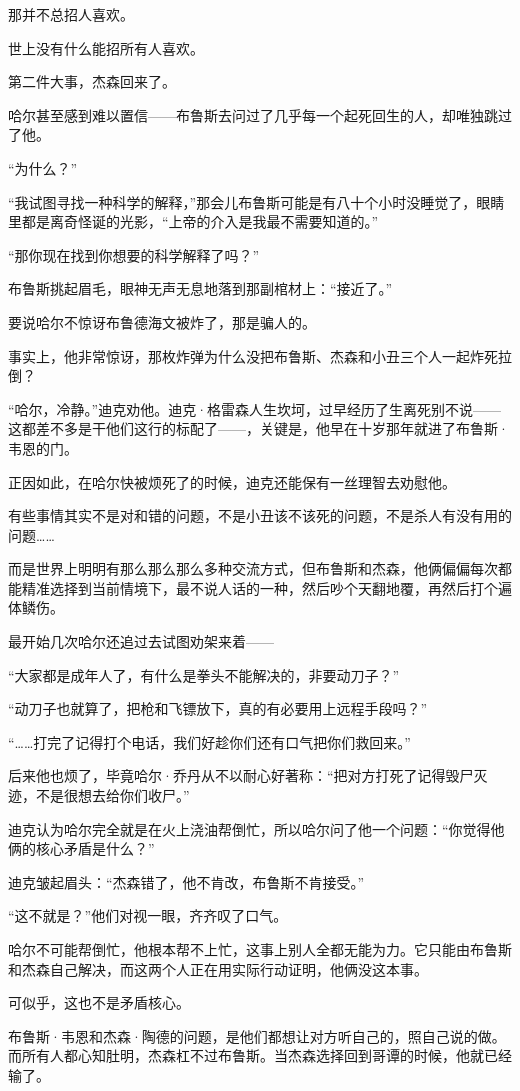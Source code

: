 \documentclass[../main]{subfiles}
\begin{document}
那并不总招人喜欢。

世上没有什么能招所有人喜欢。

第二件大事，杰森回来了。

哈尔甚至感到难以置信——布鲁斯去问过了几乎每一个起死回生的人，却唯独跳过了他。

“为什么？”

“我试图寻找一种科学的解释，”那会儿布鲁斯可能是有八十个小时没睡觉了，眼睛里都是离奇怪诞的光影，“上帝的介入是我最不需要知道的。”

“那你现在找到你想要的科学解释了吗？”

布鲁斯挑起眉毛，眼神无声无息地落到那副棺材上：“接近了。”

要说哈尔不惊讶布鲁德海文被炸了，那是骗人的。

事实上，他非常惊讶，那枚炸弹为什么没把布鲁斯、杰森和小丑三个人一起炸死拉倒？

“哈尔，冷静。”迪克劝他。迪克·格雷森人生坎坷，过早经历了生离死别不说——这都差不多是干他们这行的标配了——，关键是，他早在十岁那年就进了布鲁斯·韦恩的门。

正因如此，在哈尔快被烦死了的时候，迪克还能保有一丝理智去劝慰他。

有些事情其实不是对和错的问题，不是小丑该不该死的问题，不是杀人有没有用的问题……

而是世界上明明有那么那么那么多种交流方式，但布鲁斯和杰森，他俩偏偏每次都能精准选择到当前情境下，最不说人话的一种，然后吵个天翻地覆，再然后打个遍体鳞伤。

最开始几次哈尔还追过去试图劝架来着——

“大家都是成年人了，有什么是拳头不能解决的，非要动刀子？”

“动刀子也就算了，把枪和飞镖放下，真的有必要用上远程手段吗？”

“……打完了记得打个电话，我们好趁你们还有口气把你们救回来。”

后来他也烦了，毕竟哈尔·乔丹从不以耐心好著称：“把对方打死了记得毁尸灭迹，不是很想去给你们收尸。”

迪克认为哈尔完全就是在火上浇油帮倒忙，所以哈尔问了他一个问题：“你觉得他俩的核心矛盾是什么？”

迪克皱起眉头：“杰森错了，他不肯改，布鲁斯不肯接受。”

“这不就是？”他们对视一眼，齐齐叹了口气。

哈尔不可能帮倒忙，他根本帮不上忙，这事上别人全都无能为力。它只能由布鲁斯和杰森自己解决，而这两个人正在用实际行动证明，他俩没这本事。

可似乎，这也不是矛盾核心。

布鲁斯·韦恩和杰森·陶德的问题，是他们都想让对方听自己的，照自己说的做。而所有人都心知肚明，杰森杠不过布鲁斯。当杰森选择回到哥谭的时候，他就已经输了。
\end{document}

